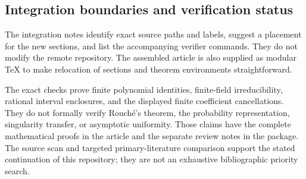 \subsection{Integration boundaries and verification status}

The integration notes identify exact source paths and labels, suggest
a placement for the new sections, and list the accompanying verifier
commands. They do not modify the remote repository. The assembled
article is also supplied as modular TeX to make relocation of sections
and theorem environments straightforward.

The exact checks prove finite polynomial identities, finite-field
irreducibility, rational interval enclosures, and the displayed finite
coefficient cancellations. They do not formally verify Rouch\'e's
theorem, the probability representation, singularity transfer, or
asymptotic uniformity. Those claims have the complete mathematical
proofs in the article and the separate review notes in the package.
The source scan and targeted primary-literature comparison support
the stated continuation of this repository; they are not an exhaustive
bibliographic priority search.

